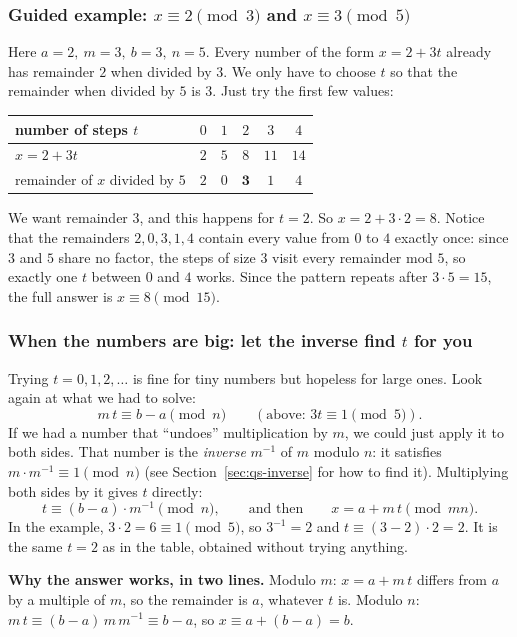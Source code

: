 \documentclass[11pt]{article}
\theoremstyle{definition}
\theoremstyle{remark}
\begin{document}
\subsubsection*{Guided example: $x\equiv2\pmod3$ and $x\equiv3\pmod5$}

Here $a=2,\ m=3,\ b=3,\ n=5$. Every number of the form $x=2+3t$ already has remainder $2$ when divided by $3$. We only have to choose $t$ so that the remainder when divided by $5$ is $3$. Just try the first few values:
\begin{center}
\begin{tabular}{lccccc}
\toprule
number of steps $t$ & $0$ & $1$ & $2$ & $3$ & $4$ \\
\midrule
$x=2+3t$ & $2$ & $5$ & $8$ & $11$ & $14$ \\
remainder of $x$ divided by $5$ & $2$ & $0$ & $\mathbf{3}$ & $1$ & $4$ \\
\bottomrule
\end{tabular}
\end{center}
We want remainder $3$, and this happens for $t=2$. So $x=2+3\cdot2=8$. Notice that the remainders $2,0,3,1,4$ contain every value from $0$ to $4$ exactly once: since $3$ and $5$ share no factor, the steps of size $3$ visit every remainder mod $5$, so exactly one $t$ between $0$ and $4$ works. Since the pattern repeats after $3\cdot5=15$, the full answer is $x\equiv8\pmod{15}$.

\subsubsection*{When the numbers are big: let the inverse find $t$ for you}

Trying $t=0,1,2,\dots$ is fine for tiny numbers but hopeless for large ones. Look again at what we had to solve:
\[
m\,t\equiv b-a\pmod n\qquad(\text{above: } 3t\equiv 1 \pmod 5).
\]
If we had a number that ``undoes'' multiplication by $m$, we could just apply it to both sides. That number is the \emph{inverse} $m^{-1}$ of $m$ modulo $n$: it satisfies $m\cdot m^{-1}\equiv1\pmod n$ (see Section~\ref{sec:qs-inverse} for how to find it). Multiplying both sides by it gives $t$ directly:
\[
t\equiv (b-a)\cdot m^{-1}\pmod n,\qquad\text{and then}\qquad x=a+m\,t\pmod{mn}.
\]
In the example, $3\cdot2=6\equiv1\pmod5$, so $3^{-1}=2$ and $t\equiv(3-2)\cdot2=2$. It is the same $t=2$ as in the table, obtained without trying anything.

\textbf{Why the answer works, in two lines.} Modulo $m$: $x=a+m\,t$ differs from $a$ by a multiple of $m$, so the remainder is $a$, whatever $t$ is. Modulo $n$: $m\,t\equiv (b-a)\,m\,m^{-1}\equiv b-a$, so $x\equiv a+(b-a)=b$.
\end{document}
